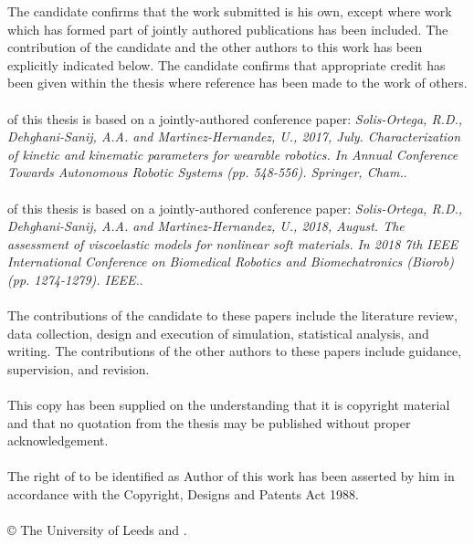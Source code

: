 
\begin{ipstatement}
The candidate confirms that the work submitted is his own, except where work which has formed part of jointly authored publications has been included. The contribution of the candidate and the other authors to this work has been explicitly indicated below. The candidate confirms that appropriate credit has been given within the thesis where reference has been made to the work of others.
\\
\\
 of this thesis is based on a jointly-authored conference paper: \textit{Solis-Ortega, R.D., Dehghani-Sanij, A.A. and Martinez-Hernandez, U., 2017, July. Characterization of kinetic and kinematic parameters for wearable robotics. In Annual Conference Towards Autonomous Robotic Systems (pp. 548-556). Springer, Cham.}.
\\
\\
 of this thesis is based on a jointly-authored conference paper: \textit{Solis-Ortega, R.D., Dehghani-Sanij, A.A. and Martinez-Hernandez, U., 2018, August. The assessment of viscoelastic models for nonlinear soft materials. In 2018 7th IEEE International Conference on Biomedical Robotics and Biomechatronics (Biorob) (pp. 1274-1279). IEEE.}.
\\
\\
The contributions of the candidate to these papers include the literature review, data collection, design and execution of simulation, statistical analysis, and writing. The contributions of the other authors to these papers include guidance, supervision, and revision.
\\
\\
This copy has been supplied on the understanding that it is copyright material and that no quotation from the thesis may be published without proper acknowledgement.
\\
\\
The right of \theAuthor{} to be identified as Author of this work has been asserted by him in accordance with the Copyright, Designs and Patents Act 1988.
\\
\\
\copyright{} \yeardate{\today} The University of Leeds and \theAuthor{}.

\label{ips}
\end{ipstatement}


